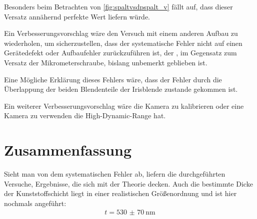 \documentclass[11pt,ngerman]{scrartcl}
\begin{document}
\noindent Besonders beim Betrachten von \autoref{fig:spaltvsdpspalt_v} fällt auf, dass
dieser Versatz annähernd perfekte Wert liefern würde.

\vspace{2mm}

\noindent Ein Verbesserungsvorschlag wäre den Versuch mit einem anderen Aufbau zu
wiederholen, um sicherzustellen, dass der systematische Fehler nicht auf einen
Gerätedefekt oder Aufbaufehler zurückzuführen ist, der , im Gegensatz zum
Versatz der Mikrometerschraube, bislang unbemerkt geblieben ist.

\noindent Eine Mögliche Erklärung dieses Fehlers wäre, dass der Fehler durch die
Überlappung der beiden Blendenteile der Irisblende zustande gekommen ist.

\noindent Ein weiterer Verbesserungsvorschlag wäre die Kamera zu kalibrieren oder
eine Kamera zu verwenden die High-Dynamic-Range hat.

\section{Zusammenfassung}

Sieht man von dem systematischen Fehler ab, liefern die durchgeführten
Versuche, Ergebnisse, die sich mit der Theorie decken. Auch die bestimmte Dicke
der Kunststoffschicht liegt in einer realistischen Größenordnung und ist hier nochmals
angeführt:
\begin{align*}
	t = \SI{530(70)}{\nm}
\end{align*}




\newpage

\printbibliography
\listoffigures
\listoftables
\end{document}

